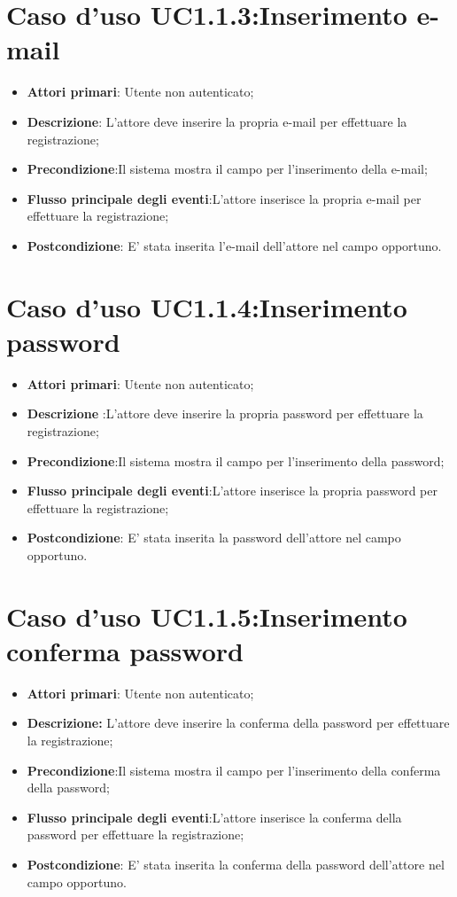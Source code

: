 \section{Caso d'uso UC1.1.3:Inserimento e-mail}
	\begin{itemize}
		\item \textbf{Attori primari}: Utente non autenticato;
		\item \textbf{Descrizione}: L'attore deve inserire la propria e-mail per effettuare la  registrazione;
		\item \textbf{Precondizione}:Il sistema mostra il campo per l'inserimento della e-mail;
		\item \textbf{Flusso principale degli eventi}:L'attore inserisce la propria e-mail per effettuare la registrazione;
		\item \textbf{Postcondizione}: E' stata inserita l'e-mail dell'attore nel campo opportuno.
	\end{itemize}

\section{Caso d'uso UC1.1.4:Inserimento  password}
	\begin{itemize}
		\item \textbf{Attori primari}: Utente non autenticato;
		\item \textbf{Descrizione} :L'attore deve inserire la propria password per effettuare la registrazione;
		\item \textbf{Precondizione}:Il sistema mostra il campo per l'inserimento della password;
		\item \textbf{Flusso principale degli eventi}:L'attore inserisce la propria password per effettuare la registrazione;
		\item \textbf{Postcondizione}: E' stata inserita la password dell'attore nel campo opportuno.
	\end{itemize}

\section{Caso d'uso UC1.1.5:Inserimento  conferma password}
\begin{itemize}
	\item \textbf{Attori primari}: Utente non autenticato;
	\item \textbf{Descrizione:} L'attore deve inserire la conferma della password per effettuare la registrazione;
	\item \textbf{Precondizione}:Il sistema mostra il campo per l'inserimento della conferma della password;
	\item \textbf{Flusso principale degli eventi}:L'attore inserisce la conferma della password per effettuare la registrazione;
	\item \textbf{Postcondizione}: E' stata inserita la conferma della password dell'attore nel campo opportuno.
\end{itemize}

